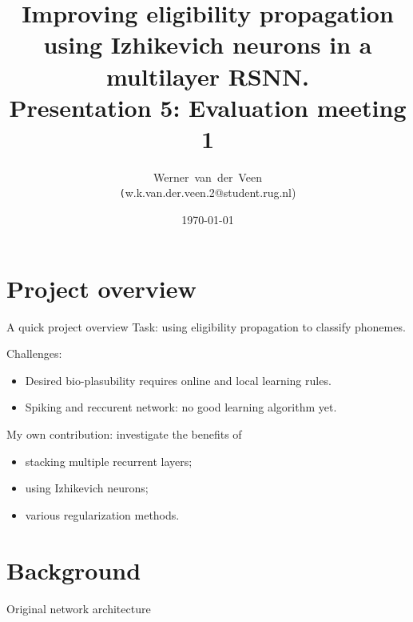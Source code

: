\documentclass[t]{beamer}
\title[Eligibility propagation]{Improving eligibility propagation using Izhikevich neurons in a multilayer RSNN.\\\vspace{10pt}
\large{Presentation 5: Evaluation meeting 1}}
\author[Werner]{Werner~van~der~Veen\\\footnotesize\texttt({w.k.van.der.veen.2@student.rug.nl})}\date{\today}
\begin{document}
\begin{frame}
    \titlepage
\end{frame}



\small
\section{Project overview}
\begin{frame}{A quick project overview}
	Task: using eligibility propagation to classify phonemes.
	
	Challenges:
	\begin{itemize}[label=--]
		\item Desired bio-plasubility requires online and local learning rules.
		\item Spiking and reccurent network: no good learning algorithm yet.
	\end{itemize}
	
	My own contribution: investigate the benefits of
	\begin{itemize}[label=--]
		\item stacking multiple recurrent layers;
		\item using Izhikevich neurons;
		\item various regularization methods.
	\end{itemize}
		
\end{frame}

\section{Background}
\begin{frame}{Original network architecture}
	\begin{figure}[!ht]
		
	\end{figure}
\end{frame}
\end{document}
